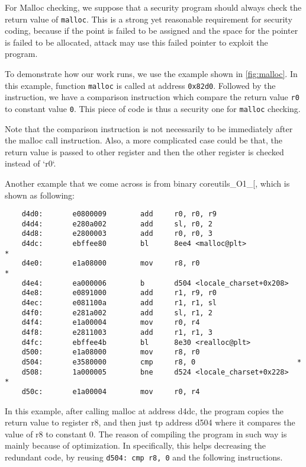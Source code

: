 For Malloc checking, we suppose that a security program should always check the
return value of \texttt{malloc}. This is a strong yet reasonable requirement for
security coding, because if the point is failed to be assigned and the space for
the pointer is failed to be allocated, attack may use this failed pointer to
exploit the program.

To demonstrate how our work runs, we use the example shown in \ref{fig:malloc}.
In this example, function \texttt{malloc} is called at address \texttt{0x82d0}.
Followed by the instruction, we have a comparison instruction which compare the
return value \texttt{r0} to constant value \texttt{0}. This piece of code is
thus a security one for \texttt{malloc} checking.

Note that the comparison instruction is not necessarily to be immediately after
the malloc call instruction. Also, a more complicated case could be that, the
return value is passed to other register and then the other register is checked
instead of `r0`.

Another example that we come across is from binary coreutils\_O1\_[, which is
shown as following:

\begin{center}
\lstset{language=C,
caption=Malloc disassembly, breaklines=true, basicstyle=\tiny, numbers=none}
\begin{lstlisting}
    d4d0:       e0800009        add     r0, r0, r9
    d4d4:       e280a002        add     sl, r0, 2
    d4d8:       e2800003        add     r0, r0, 3
    d4dc:       ebffee80        bl      8ee4 <malloc@plt>             *
    d4e0:       e1a08000        mov     r8, r0                        *
    d4e4:       ea000006        b       d504 <locale_charset+0x208>
    d4e8:       e0891000        add     r1, r9, r0
    d4ec:       e081100a        add     r1, r1, sl
    d4f0:       e281a002        add     sl, r1, 2
    d4f4:       e1a00004        mov     r0, r4
    d4f8:       e2811003        add     r1, r1, 3
    d4fc:       ebffee4b        bl      8e30 <realloc@plt>
    d500:       e1a08000        mov     r8, r0
    d504:       e3580000        cmp     r8, 0                        *
    d508:       1a000005        bne     d524 <locale_charset+0x228>   *
    d50c:       e1a00004        mov     r0, r4
\end{lstlisting}
\end{center}
In this example, after calling malloc at address d4dc, the program copies the
return value to register r8, and then just tp address d504 where it compares the
value of r8 to constant 0. The reason of compiling the program in such way is
mainly because of optimization. In specifically, this helps decreasing the
redundant code, by reusing \texttt{d504: cmp r8, 0} and the following instructions.

